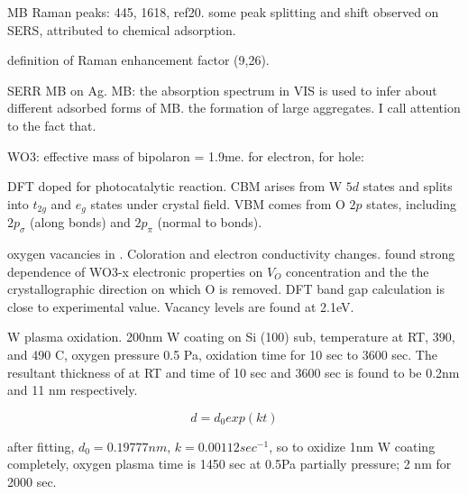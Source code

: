 MB Raman peaks: 445, 1618, ref20. some peak splitting and shift observed on SERS, attributed to chemical adsorption.

definition of Raman enhancement factor (9,26).

SERR MB on Ag. \cite{Nicolai2003}
MB: the absorption spectrum in VIS is used to infer about different adsorbed forms of MB. the formation of large aggregates. I call attention to the fact that.

WO3: effective mass of bipolaron = 1.9me. for electron, for hole:

DFT doped  for photocatalytic reaction.\cite{Wang2012} CBM arises from W $5d$ states and splits into $t_{2g}$ and $e_g$ states under crystal field. VBM comes from O $2p$ states, including $2p_\sigma$ (along  bonds) and $2p_\pi$ (normal to  bonds).

oxygen vacancies in .\cite{Wang2011b}  Coloration and electron conductivity changes. \citeauthor{Wang2011b} found strong dependence of WO3-x electronic properties on $V_O$ concentration and the the crystallographic direction on which O is removed. DFT band gap calculation is close to experimental value. Vacancy levels are found at 2.1eV.



W plasma oxidation.\cite{Romanyuk2005} 200nm W coating on Si (100) sub, temperature at RT, 390, and 490 C, oxygen pressure 0.5 Pa, oxidation time for 10 sec to 3600 sec. The resultant thickness of  at RT  and time of 10 sec and 3600 sec is found to be 0.2nm and 11 nm respectively.

\[
 d = d_0 exp(kt)
\]

after fitting, $d_0 = 0.19777 nm$, $k = 0.00112 sec^{-1}$, so to oxidize 1nm W coating completely, oxygen plasma time is 1450 sec at 0.5Pa partially pressure; 2 nm for 2000 sec.

